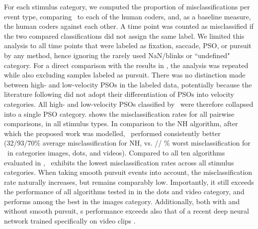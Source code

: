 For each stimulus category, we computed the proportion of misclassifications
per event type, comparing \remodnav\ to each of the human coders, and, as a
baseline measure, the human coders against each other.
%
A time point was counted as misclassified if the two compared classifications
did not assign the same label. We limited this analysis to all time points that
were labeled as fixation, saccade, PSO, or pursuit by any method, hence
ignoring the rarely used NaN/blinks or ``undefined" category. For a direct
comparison with the results in \cite{Andersson2017}, the analysis was repeated
while also excluding samples labeled as pursuit.
There was no distinction made between high- and low-velocity PSOs in the labeled
data, potentially because the literature following \citet{Nystrom2010AnData}
did not adopt their differentiation of PSOs into velocity categories.
All high- and low-velocity PSOs classified by \remodnav\ were therefore
collapsed into a single PSO category.  shows the
misclassification rates for all pairwise comparisons, in all stimulus types.
In comparison to the NH algorithm, after which the proposed work was modelled,
\remodnav\ performed consistently better (32/93/70\% average misclassification for NH,
vs. \imgMNALMclfWOP/\dotsRAALMclfWOP/ \videoRAALMclfWOP\% worst
misclassification for \remodnav\ in categories images, dots, and videos). Compared to all ten
algorithms evaluated in \citet{Andersson2017}, \remodnav\ exhibits the lowest
misclassification rates across all stimulus categories.
%
When taking smooth pursuit events into account, the misclassification rate
naturally increases, but remains comparably low. Importantly, it still exceeds the
performance of all algorithms tested in \citet{Andersson2017} in the dots
and video category, and performs among the best in the images category.
Additionally, both with and without smooth pursuit, \remodnav s performance
exceeds also that of a recent deep neural network trained specifically on
video clips \citep[compare Table 7: 34\% misclassification versus \videoMNALMCLF\%
for \remodnav]{Startsev2018}.


